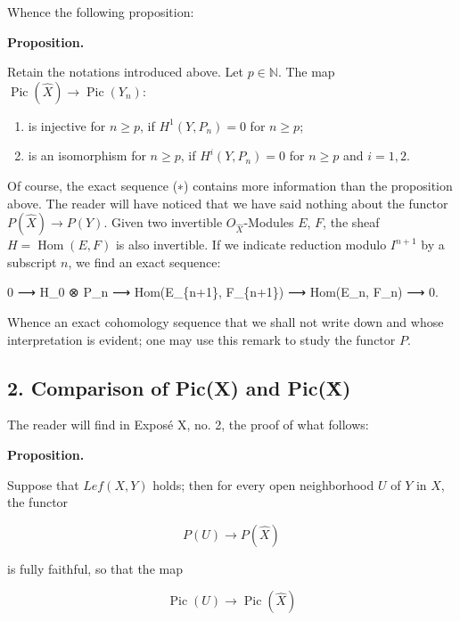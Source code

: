 \documentclass[
]{article}
\newenvironment{Shaded}{}{}
\newcommand{\NormalTok}[1]{#1}
\providecommand{\tightlist}{%
  \setlength{\itemsep}{0pt}\setlength{\parskip}{0pt}}
\begin{document}
Whence the following proposition:

\textbf{Proposition.}

Retain the notations introduced above. Let \(p \in \mathbb{N}\). The map
\(\operatorname{Pic}(\hat{X}) \to \operatorname{Pic}(Y_{n})\):

\begin{enumerate}
\def\labelenumi{\arabic{enumi}.}
\tightlist
\item
  is injective for \(n \geqslant p\), if \(H^{1}(Y, P_{n}) = 0\) for
  \(n \geqslant p\);
\item
  is an isomorphism for \(n \geqslant p\), if \(H^{i}(Y, P_{n}) = 0\)
  for \(n \geqslant p\) and \(i = 1, 2\).
\end{enumerate}

Of course, the exact sequence (∗) contains more information than the
proposition above. The reader will have noticed that we have said
nothing about the functor \(P(\hat{X}) \to P(Y)\). Given two invertible
\(O_{\hat{X}}\)-Modules \(E\), \(F\), the sheaf
\(H = \operatorname{Hom}(E, F)\) is also invertible. If we indicate
reduction modulo \(I^{n+1}\) by a subscript \(n\), we find an exact
sequence:

\begin{Shaded}
\begin{Highlighting}[]
\NormalTok{0 ⟶ H\_0 ⊗ P\_n ⟶ Hom(E\_\{n+1\}, F\_\{n+1\}) ⟶ Hom(E\_n, F\_n) ⟶ 0.}
\end{Highlighting}
\end{Shaded}

Whence an exact cohomology sequence that we shall not write down and
whose interpretation is evident; one may use this remark to study the
functor \(P\).

\subsection{2. Comparison of Pic(X) and
Pic(X̂)}\label{comparison-of-picx-and-picx}

The reader will find in Exposé X, no. 2, the proof of what follows:

\textbf{Proposition.}

Suppose that \(Lef(X, Y)\) holds; then for every open neighborhood \(U\)
of \(Y\) in \(X\), the functor

\[
P(U) \longrightarrow P(\hat{X})
\]

is fully faithful, so that the map

\[
\operatorname{Pic}(U) \longrightarrow \operatorname{Pic}(\hat{X})
\]
\end{document}
